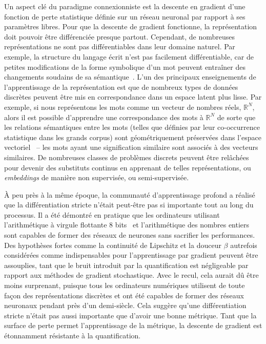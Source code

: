 Un aspect clé du paradigme connexionniste est la descente en gradient d'une fonction de perte statistique définie sur un réseau neuronal par rapport à ses paramètres libres. Pour que la descente de gradient fonctionne, la représentation doit pouvoir être différenciée presque partout. Cependant, de nombreuses représentations ne sont pas différentiables dans leur domaine naturel. Par exemple, la structure du langage écrit n'est pas facilement différentiable, car de petites modifications de la forme symbolique d'un mot peuvent entraîner des changements soudains de sa sémantique~\citep{vanmerrienboer2018phd}. L'un des principaux enseignements de l'apprentissage de la représentation est que de nombreux types de données discrètes peuvent être mis en correspondance dans un espace latent plus lisse. Par exemple, si nous représentons les mots comme un vecteur de nombres réels, $\mathbb R^N$, alors il est possible d'apprendre une correspondance des mots à $\mathbb R^N$ de sorte que les relations sémantiques entre les mots (telles que définies par leur co-occurrence statistique dans les grands corpus) sont géométriquement préservées dans l'espace vectoriel~\citep{pennington2014glove} -- les mots ayant une signification similaire sont associés à des vecteurs similaires. De nombreuses classes de problèmes discrets peuvent être relâchées pour devenir des substituts continus en apprenant de telles représentations, ou \textit{embeddings} de manière non supervisée, ou semi-supervisée.

À peu près à la même époque, la communauté d'apprentissage profond a réalisé que la différentiation stricte n'était peut-être pas si importante tout au long du processus. Il a été démontré en pratique que les ordinateurs utilisant l'arithmétique à virgule flottante 8 bits~\citep{wang2018training} et l'arithmétique des nombres entiers~\citep{wu2018training, jacob2018quantization} sont capables de former des réseaux de neurones sans sacrifier les performances. Des hypothèses fortes comme la continuité de Lipschitz et la douceur $\beta$ autrefois considérées comme indispensables pour l'apprentissage par gradient peuvent être assouplies, tant que le bruit introduit par la quantification est négligeable par rapport aux méthodes de gradient stochastique. Avec le recul, cela aurait dû être moins surprenant, puisque tous les ordinateurs numériques utilisent de toute façon des représentations discrètes et ont été capables de former des réseaux neuronaux pendant près d'un demi-siècle. Cela suggère qu'une différentiation stricte n'était pas aussi importante que d'avoir une bonne métrique. Tant que la surface de perte permet l'apprentissage de la métrique, la descente de gradient est étonnamment résistante à la quantification.

